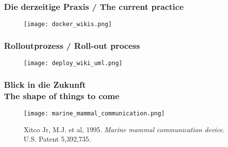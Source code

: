 \documentclass[13pt]{beamer}
\begin{document}
\begin{frame}
  \frametitle{Die derzeitige Praxis / \textcolor{mfn_green}{The current practice}}
  \begin{figure}
    \texttt{[image: docker\_wikis.png]}
  \end{figure}
\end{frame}

\begin{frame}
  \frametitle{Rolloutprozess / \textcolor{mfn_green}{Roll-out process}}

  \begin{figure}
    \texttt{[image: deploy\_wiki\_uml.png]}
  \end{figure}

\end{frame}

%
%

\begin{frame}
  \frametitle{Blick in die Zukunft \\ \textcolor{mfn_green}{The shape of things to come}}
  \begin{figure}
    \texttt{[image: marine\_mammal\_communication.png]}
    \caption{Xitco Jr, M.J. et al, 1995. \textit{Marine mammal communication device}. U.S. Patent 5,392,735.}
  \end{figure}
\end{frame}
\end{document}

